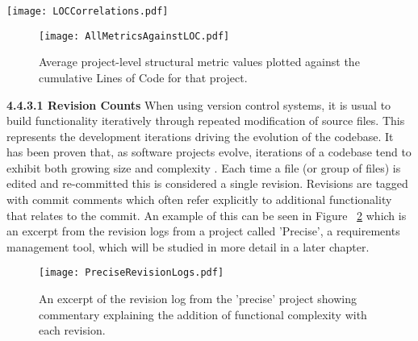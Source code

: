 \begin{table}
\centering 
{}
\begin{tabular}
 \centering 
 \texttt{[image: LOCCorrelations.pdf]}
 \label{tab:LOCCorrelations}
\end{tabular}
\end{table}

\begin{figure}[htbp!] 
\centering    
\texttt{[image: AllMetricsAgainstLOC.pdf]}
\caption{Average project-level structural metric values plotted against the cumulative Lines of Code for that project.}
\label{fig:AllMetricsAgainstLOC}
\end{figure}

\newline
\textbf{4.4.3.1 Revision Counts}
\newline
When using version control systems, it is usual to build functionality iteratively through repeated modification of source files. This represents the development iterations driving the evolution of the codebase. It has been proven that, as software projects evolve, iterations of a codebase tend to exhibit both growing size and complexity \citep{prather1984axiomatic}. Each time a file (or group of files) is edited and re-committed this is considered a single revision. Revisions are tagged with commit comments which often refer explicitly to additional functionality that relates to the commit. An example of this can be seen in Figure ~\ref{fig:PreciseRevisionLogs} which is an excerpt from the revision logs from a project called 'Precise', a requirements management tool, which will be studied in more detail in a later chapter.

\begin{figure}[htbp!] 
\centering    
\texttt{[image: PreciseRevisionLogs.pdf]}
\caption{An excerpt of the revision log from the 'precise' project showing commentary explaining the addition of functional complexity with each revision.}
\label{fig:PreciseRevisionLogs}
\end{figure}

